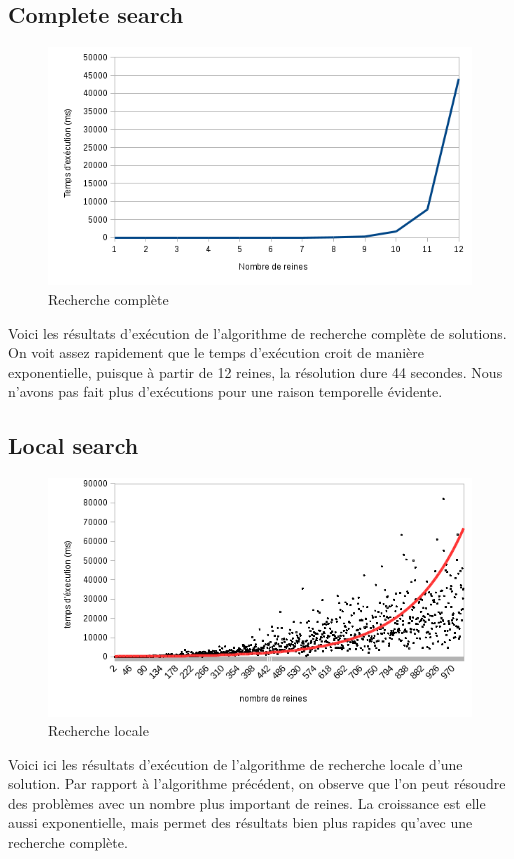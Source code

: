 \documentclass{article}
\begin{document}
\subsection{Complete search}
\begin{figure}[!h]
	\caption{\label{csearch} Recherche complète}
	\begin{center}
	\includegraphics[scale=0.5]{./picture/compelte_search.png}
	\end{center}
\end{figure}
Voici les résultats d'exécution de l'algorithme de recherche complète de solutions. On voit assez rapidement que le temps d'exécution croit de manière exponentielle, puisque à partir de 12 reines, la résolution dure 44 secondes. Nous n'avons pas fait plus d'exécutions pour une raison temporelle évidente.

\subsection{Local search}
\begin{figure}[!h]
	\caption{\label{lsearch} Recherche locale}
	\begin{center}
	\includegraphics[scale=0.5]{./picture/local_search.png}
	\end{center}
\end{figure}
Voici ici les résultats d'exécution de l'algorithme de recherche locale d'une solution. Par rapport à l'algorithme précédent, on observe que l'on peut résoudre des problèmes avec un nombre plus important de reines. La croissance est elle aussi exponentielle, mais permet des résultats bien plus rapides qu'avec une recherche complète. 
\end{document}
